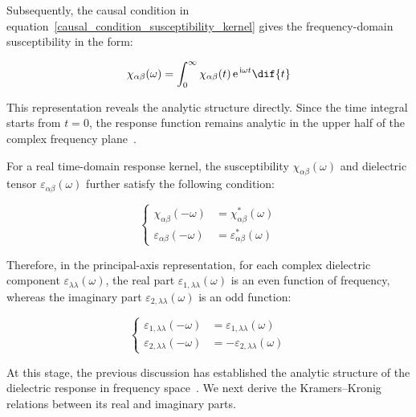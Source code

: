 Subsequently, the causal condition in equation~\eqref{causal_condition_susceptibility_kernel}
gives the frequency-domain susceptibility in the form:

\begin{equation}
\chi_{\alpha\beta}(\omega) =
    \int_{0}^{\infty}
    \chi_{\alpha\beta}(t)
    \,\mathrm{e}^{\,\mathrm{i}\omega t}
    \dif{t}
\label{frequency_domain_susceptibility_from_causality}
\end{equation}

This representation reveals the analytic structure directly.
Since the time integral starts from $t=0$, the response function remains analytic in the upper half of the complex frequency plane~\cite{nussenzveig1972causality}.

For a real time-domain response kernel, the susceptibility $\chi_{\alpha\beta}(\omega)$
and dielectric tensor $\varepsilon_{\alpha\beta}(\omega)$ further satisfy the following condition:

\begin{equation}
\left\{\begin{aligned}
    \chi_{\alpha\beta}(-\omega)
    &= \chi_{\alpha\beta}^{*}(\omega) \\
    \varepsilon_{\alpha\beta}(-\omega)
    &= \varepsilon_{\alpha\beta}^{*}(\omega)
\end{aligned}\right.
\label{reality_condition_response_functions}
\end{equation}

Therefore, in the principal-axis representation,
for each complex dielectric component $\varepsilon_{\lambda\lambda}(\omega)$,
the real part $\varepsilon_{1,\lambda\lambda}(\omega)$ is an even function of frequency,
whereas the imaginary part $\varepsilon_{2,\lambda\lambda}(\omega)$ is an odd function:

\begin{equation}
\left\{\begin{aligned}
    \varepsilon_{1,\lambda\lambda}(-\omega)
    &= \varepsilon_{1,\lambda\lambda}(\omega) \\
    \varepsilon_{2,\lambda\lambda}(-\omega)
    &= -\varepsilon_{2,\lambda\lambda}(\omega)
\end{aligned}\right.
\label{parity_of_dielectric_components}
\end{equation}

At this stage, the previous discussion has established the analytic structure of the dielectric response in frequency space~\cite{nussenzveig1972causality,franta2020symmetry,leon2026momentum}.
We next derive the Kramers--Kronig relations between its real and imaginary parts.

